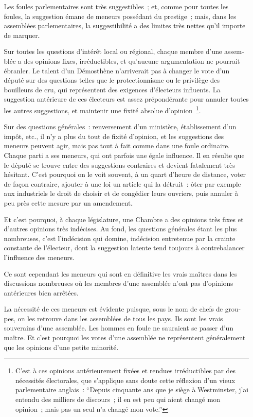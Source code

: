 \documentclass[french,twoside]{book} %
\begin{document}
Les foules parlementaires sont très suggestibles ; et, comme pour toutes les foules, la suggestion émane de meneurs possédant du prestige ; mais, dans les assem­blées parlementaires, la suggestibilité a des limites très nettes qu’il importe de marquer.\par
Sur toutes les questions d’intérêt local ou régional, chaque membre d’une assem­blée a des opinions fixes, irréductibles, et qu’aucune argumentation ne pourrait ébranler. Le talent d’un Démosthène n’arriverait pas à changer le vote d’un député sur des questions telles que le protectionnisme ou le privilège des bouilleurs de cru, qui représentent des exigences d’électeurs influents. La suggestion antérieure de ces élec­teurs est assez prépondérante pour annuler toutes les autres suggestions, et maintenir une fixité absolue d’opinion \footnote{C’est à ces opinions antérieurement fixées et rendues irréductibles par des nécessités électorales, que s’applique sans doute cette réflexion d’un vieux parlementaire anglais : “Depuis cinquante ans que je siège à Westminster, j’ai entendu des milliers de discours ; il en est peu qui aient changé mon opinion ; mais pas un seul n’a changé mon vote.”}.\par
Sur des questions générales : renversement d’un ministère, établissement d’un impôt, etc., il n’y a plus du tout de fixité d’opinion, et les suggestions des meneurs peuvent agir, mais pas tout à fait comme dans une foule ordinaire. Chaque parti a ses meneurs, qui ont parfois une égale influence. Il en résulte que le député se trouve entre des suggestions contraires et devient fatalement très hésitant. C’est pourquoi on le voit souvent, à un quart d’heure de distance, voter de façon contraire, ajouter à une loi un article qui la détruit : ôter par exemple aux industriels le droit de choisir et de congédier leurs ouvriers, puis annuler à peu près cette mesure par un amendement.\par
Et c’est pourquoi, à chaque législature, une Chambre a des opinions très fixes et d’autres opinions très indécises. Au fond, les questions générales étant les plus nom­breuses, c’est l’indécision qui domine, indécision entretenue par la crainte constante de l’électeur, dont la suggestion latente tend toujours à contrebalancer l’influence des meneurs.\par
Ce sont cependant les meneurs qui sont en définitive les vrais maîtres dans les discussions nombreuses où les membres d’une assemblée n’ont pas d’opinions antérieures bien arrêtées.\par
La nécessité de ces meneurs est évidente puisque, sous le nom de chefs de grou­pes, on les retrouve dans les assemblées de tous les pays. Ils sont les vrais souverains d’une assemblée. Les hommes en foule ne sauraient se passer d’un maître. Et c’est pourquoi les votes d’une assemblée ne représentent généralement que les opinions d’une petite minorité.\par
\end{document}
